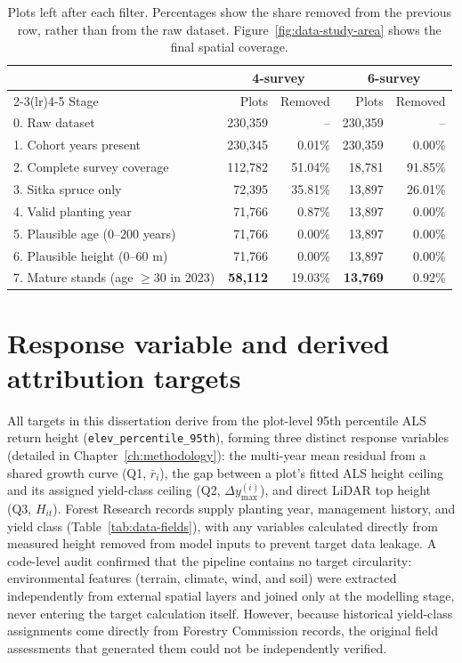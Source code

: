 \documentclass[logo,msc,ai]{infthesis}           %
\begin{document}
\begin{table}[!htbp]
\centering
\scriptsize
\begin{tabular}{lrrrr}
\toprule
& \multicolumn{2}{c}{4-survey} & \multicolumn{2}{c}{6-survey} \\
\cmidrule(lr){2-3}\cmidrule(lr){4-5}
Stage & Plots & Removed & Plots & Removed \\
\midrule
0. Raw dataset
& 230,359 & -- & 230,359 & -- \\
1. Cohort years present
& 230,345 & 0.01\% & 230,359 & 0.00\% \\
2. Complete survey coverage
& 112,782 & 51.04\% & 18,781 & 91.85\% \\
3. Sitka spruce only
& 72,395 & 35.81\% & 13,897 & 26.01\% \\
4. Valid planting year
& 71,766 & 0.87\% & 13,897 & 0.00\% \\
5. Plausible age (0--200 years)
& 71,766 & 0.00\% & 13,897 & 0.00\% \\
6. Plausible height (0--60 m)
& 71,766 & 0.00\% & 13,897 & 0.00\% \\
7. Mature stands (age $\geq 30$ in 2023)
& \textbf{58,112} & 19.03\%
& \textbf{13,769} & 0.92\% \\
\bottomrule
\end{tabular}
\caption{\small{Plots left after each filter. Percentages show the share removed from the previous row, rather than from the raw dataset. Figure~\ref{fig:data-study-area} shows the final spatial coverage.}}
\label{tab:data-cleaning-funnel}
\end{table}

\section{Response variable and derived attribution targets}
All targets in this dissertation derive from the plot-level 95th percentile ALS return height (\texttt{elev\_percentile\_95th}), forming three distinct response variables (detailed in Chapter~\ref{ch:methodology}): the multi-year mean residual from a shared growth curve (Q1, $\bar{r}_i$), the gap between a plot's fitted ALS height ceiling and its assigned yield-class ceiling (Q2, $\Delta y_{\max}^{(i)}$), and direct LiDAR top height (Q3, $H_{it}$). Forest Research records supply planting year, management history, and yield class (Table~\ref{tab:data-fields}), with any variables calculated directly from measured height removed from model inputs to prevent target data leakage. A code-level audit confirmed that the pipeline contains no target circularity: environmental features (terrain, climate, wind, and soil) were extracted independently from external spatial layers and joined only at the modelling stage, never entering the target calculation itself. However, because historical yield-class assignments come directly from Forestry Commission records, the original field assessments that generated them could not be independently verified.
\end{document}
